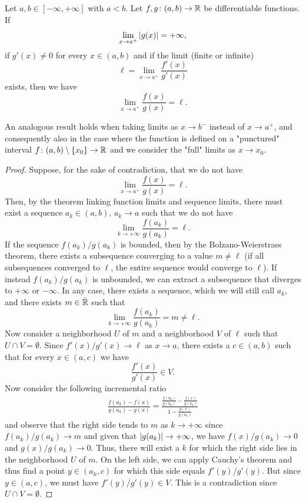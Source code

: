 \begin{theorem}
\mymark{*}
%
Let $a,b\in [-\infty,+\infty]$ with $a<b$.
Let $f,g \colon (a,b)\to {\mathbb R}$ be differentiable functions.
If
\[
 \lim_{x\to a^+} {\left|g(x)\right|} = +\infty,
\]
if $g'(x) \neq 0$ for every $x\in (a,b)$
and if the limit (finite or infinite)
\[
  \ell = \lim_{x\to a^+}\frac{f'(x)}{g'(x)}
\]
exists, then
we have
\[
 \lim_{x\to a^+}\frac{f(x)}{g(x)} = \ell.
\]

An analogous result holds when taking limits as $x\to b^-$ instead of $x\to
a^+$, and consequently also in the case where the function is defined on a
"punctured" interval $f\colon (a,b)\setminus{\left\{ x_0 \right\}} \to {\mathbb R}$ and we
consider the "full" limits as $x\to x_0$.
\end{theorem}
%
\begin{proof}
Suppose, for the sake of contradiction, that we do not have
\[
  \lim_{x\to a^+} \frac{f(x)}{g(x)} = \ell.
\]
Then, by the theorem linking function limits and sequence limits, there must
exist a sequence $a_k\in (a,b)$, $a_k\to a$ such that we do not have
\[
  \lim_{k\to +\infty} \frac{f(a_k)}{g(a_k)} = \ell.
\]
If the sequence $f(a_k) / g(a_k)$ is bounded, then by the Bolzano-Weierstrass
theorem, there exists a subsequence converging to a value $m\neq \ell$ (if all
subsequences converged to $\ell$, the entire sequence would converge to $\ell$).
If instead $f(a_k) / g(a_k)$ is unbounded, we can extract a subsequence that
diverges to $+\infty$ or $-\infty$. In any case, there exists a sequence, which
we will still call $a_k$, and there exists $m\in \bar {{\mathbb R}}$ such that
\[
  \lim_{k \to +\infty} \frac{f(a_k)}{g(a_k)} = m \neq \ell.
\]
Now consider a neighborhood $U$ of $m$ and a neighborhood $V$ of $\ell$ such
that $U\cap V = \emptyset$.
Since $f'(x) / g'(x) \to \ell$ as $x\to a$, there exists a $c\in (a,b)$ such
that for every $x\in (a,c)$ we have
\[
  \frac{f'(x)}{g'(x)} \in V.
\]
Now consider the following incremental ratio
\begin{align*}
\frac{f(a_k) - f(x)}{g(a_k) - g(x)}
=\frac{\frac{f(a_k)}{g(a_k)}-\frac{f(x)}{g(a_k)}}{1-\frac{g(x)}{g(a_k)}}
\end{align*}
and observe that the right side tends to $m$ as $k\to +\infty$ since
$f(a_k)/g(a_k) \to m$ and given that ${\left|g(a_k)\right|}\to +\infty$, we have
$f(x)/g(a_k)\to 0$ and $g(x)/g(a_k) \to 0$.
Thus, there will exist a $k$ for which the right side lies in the neighborhood
$U$ of $m$. On the left side, we can apply Cauchy's theorem and thus find a
point $y\in(a_k,c)$ for which this side equals $f'(y)/g'(y)$. But since $y\in
(a,c)$, we must have $f'(y)/g'(y) \in V$. This is a contradiction since $U\cap V
= \emptyset$.
\end{proof}